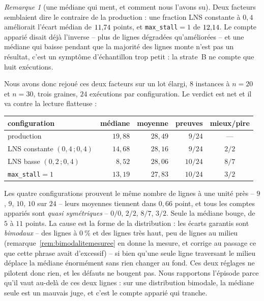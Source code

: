 \documentclass[11pt,a4paper]{article}
\theoremstyle{plain}
\theoremstyle{remark}
\newtheorem{remark}{Remarque}
\begin{document}
\begin{remark}[une médiane qui ment, et comment nous l'avons su]
\label{rem:medianeartefact}
Deux facteurs semblaient dire le contraire de la production : une fraction
LNS constante à $0{,}4$ améliorait l'écart médian de $11{,}74{}$ points, et
\texttt{max\_stall}$=1$ de $12{,}14{}$. Le compte apparié disait déjà l'inverse
-- plus de lignes dégradées qu'améliorées -- et une médiane qui baisse
pendant que la majorité des lignes monte n'est pas un résultat, c'est un
symptôme d'échantillon trop petit : la strate~B ne compte que huit
exécutions.

Nous avons donc rejoué ces deux facteurs sur un lot élargi, $8$ instances à
$n=20$ et $n=30$, trois graines, $24$ exécutions par configuration. Le
verdict est net et il va contre la lecture flatteuse :

\begin{center}\small
\begin{tabular}{lrrrc}
\toprule
configuration & médiane & \textbf{moyenne} & preuves & mieux/pire\\
\midrule
production & $19{,}88$ & $28{,}49$ & $9/24$ & ---\\
LNS constante $(0{,}4\,;0{,}4)$ & $14{,}68$ & $28{,}16$ & $9/24$ & $2/2$\\
LNS basse $(0{,}2\,;0{,}4)$ & $8{,}52$ & $28{,}06$ & $10/24$ & $8/7$\\
\texttt{max\_stall}$=1$ & $13{,}19$ & $27{,}83$ & $10/24$ & $3/2$\\
\bottomrule
\end{tabular}
\end{center}

\noindent
Les quatre configurations prouvent le même nombre de lignes à une unité
près -- $9$, $9$, $10$, $10$ sur $24$ -- leurs moyennes tiennent dans
$0{,}66$ point, et tous les comptes appariés sont \emph{quasi symétriques}
-- $0/0$, $2/2$, $8/7$, $3/2$. Seule la médiane bouge, de $5$ à $11$
points. La cause est la forme de la
distribution : les écarts garantis sont \emph{bimodaux} -- des lignes à
$0\ \%$ et des lignes très haut, peu de lignes au milieu
(remarque~\ref{rem:bimodalitemesuree} en donne la mesure, et corrige au
passage ce que cette phrase avait d'excessif) --
si bien qu'une seule ligne traversant le milieu déplace la médiane
énormément sans rien changer au fond. Ces deux réglages ne pilotent donc
rien, et les défauts ne bougent pas. Nous rapportons l'épisode parce qu'il
vaut au-delà de ces deux lignes : sur une distribution bimodale, la médiane
seule est un mauvais juge, et c'est le compte apparié qui tranche.
\end{remark}
\end{document}
